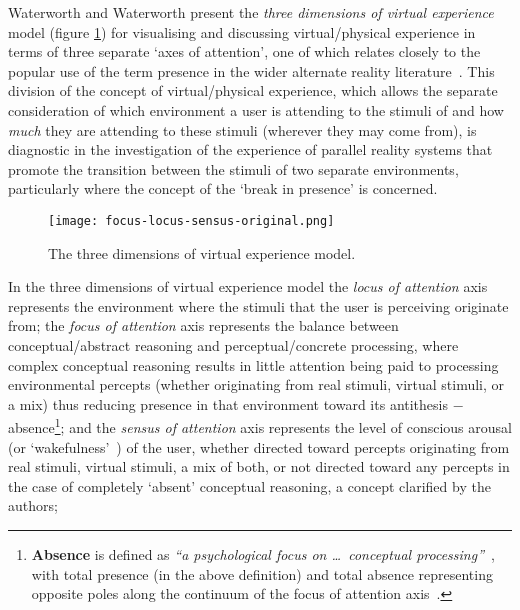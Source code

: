 \newcommand{\absencefootnote}{\footnote{\textbf{Absence} is defined as \textit{``a psychological focus on \ldots\ conceptual processing''}~\cite{Waterworth2001}, with total presence (in the above definition) and total absence representing opposite poles along the continuum of the focus of attention axis~\cite{Mantovani2010}.}}

Waterworth and Waterworth present the \textit{three dimensions of virtual experience} model (figure \ref{focus-locus-sensus-original}) for visualising and discussing virtual/physical experience in terms of three separate `axes of attention', one of which relates closely to the popular use of the term presence in the wider alternate reality literature~\cite{Waterworth2001}. This division of the concept of virtual/physical experience, which allows the separate consideration of which environment a user is attending to the stimuli of and how \textit{much} they are attending to these stimuli (wherever they may come from), is diagnostic in the investigation of the experience of parallel reality systems that promote the transition between the stimuli of two separate environments, particularly where the concept of the `break in presence' is concerned.

\begin{figure}[h]
	\begin{center}
		\texttt{[image: focus-locus-sensus-original.png]}
		\caption{The three dimensions of virtual experience model.}
		\label{focus-locus-sensus-original}
	\end{center}	
\end{figure}

In the three dimensions of virtual experience model the \textit{locus of attention} axis represents the environment where the stimuli that the user is perceiving originate from; the \textit{focus of attention} axis represents the balance between conceptual/abstract reasoning and perceptual/concrete processing, where complex conceptual reasoning results in little attention being paid to processing environmental percepts (whether originating from real stimuli, virtual stimuli, or a mix) thus reducing presence\presencefootnote{} in that environment toward its antithesis $-$ absence\absencefootnote{}; and the \textit{sensus of attention} axis represents the level of conscious arousal (or `wakefulness'~\cite{Laureys2009}) of the user, whether directed toward percepts originating from real stimuli, virtual stimuli, a mix of both, or not directed toward any percepts in the case of completely `absent' conceptual reasoning, a concept clarified by the authors;

